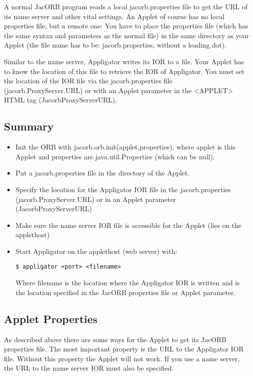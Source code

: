 A normal JacORB program reads a local jacorb.properties file to get
the URL of its name server and other vital settings. An Applet of
course has no local properties file, but a remote one: You have to
place the properties file (which has the same syntax and parameters as
the normal file) in the same directory as your Applet (the file name
has to be: jacorb.properties, without a leading dot).

Similar to the name server, Appligator writes its IOR to a file. Your
Applet has to know the location of this file to retrieve the IOR of
Appligator. You must set the location of the IOR file via the
jacorb.properties file (jacorb.ProxyServer.URL) or with an Applet
parameter in the <APPLET> HTML tag (JacorbProxyServerURL).

\subsection{Summary}

\begin{itemize}
\item Init the ORB with jacorb.orb.init(applet,properties), where applet is
this Applet and properties are java.util.Properties (which can be
null).
\item Put a jacorb.properties file in the directory of the Applet.
\item Specify the location for the Appligator IOR file in the
jacorb.properties (jacorb.ProxyServer.URL) or in an Applet parameter
(JacorbProxyServerURL)
\item Make sure the name server IOR file is
accessible for the Applet (lies on the applethost)
\item Start Appligator on the applethost (web server) with:

\verb+$ appligator <port> <filename>+

Where filename is the location where the Appligator IOR is written and is the location specified in the JacORB properties file or Applet parameter.
\end{itemize}

\subsection{Applet Properties}

As described above there are some ways for the Applet to get its JacORB properties file. The most important property is the URL to the Appligator IOR file. Without this property the Applet will not work. If you use a name server, the URL to the name server IOR must also be specified.

